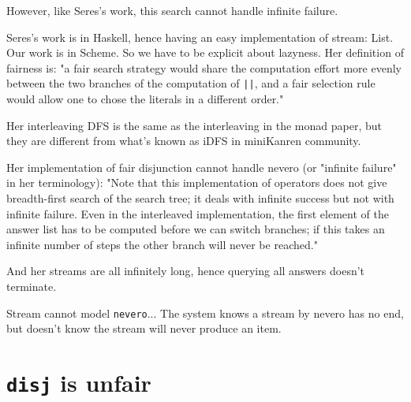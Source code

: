 \documentclass[format=acmlarge, review=true, authordraft=true]{acmart}
\begin{document}
However, like Seres's work, this search cannot handle infinite failure.

Seres's work is in Haskell, hence having an easy implementation of stream:
List. Our work is in Scheme. So we have to be explicit about lazyness.
Her definition of fairness is: "a fair search strategy would share the 
computation effort more evenly between the two branches of the computation of 
\texttt{||}, and a fair selection rule would allow one to chose the
literals in a different order."

Her interleaving DFS is the same as the interleaving in the monad paper, but 
they are different from what's known as iDFS in miniKanren community.

Her implementation of fair disjunction cannot handle nevero (or "infinite 
failure" in her terminology): "Note that this implementation of operators does 
not give breadth-first search of the search tree; it deals with infinite 
success but not with infinite failure. Even in the interleaved implementation, 
the first element of the answer list has to be computed before we can switch 
branches; if this takes an infinite number of steps the other branch will never
be reached."

And her streams are all infinitely long, hence querying all answers doesn't 
terminate.


Stream cannot model \texttt{nevero}... The system knows a stream by nevero has no end, but doesn't know the stream will never produce an item.



\section{\texttt{disj} is unfair}
\end{document}
